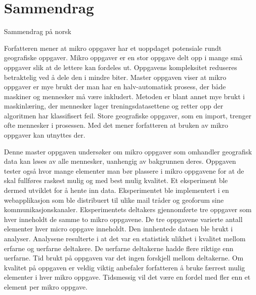 

\chapter*{Sammendrag}
%
	
	
Sammendrag på norsk

Forfatteren mener at mikro oppgaver har et uoppdaget potensiale rundt geografiske oppgaver. Mikro oppgaver er en stor oppgave delt opp i mange små oppgaver slik at de lettere kan fordeles ut. Oppgavens kompleksitet reduseres betraktelig ved å dele den i mindre biter. Master oppgaven viser at mikro oppgaver er mye brukt der man har en halv-automatisk prosess, der både maskiner og mennesker må være inkludert. Metoden er blant annet mye brukt i maskinlæring, der mennesker lager treningsdatasettene og retter opp der algoritmen har klassifisert feil. Store geografiske oppgaver, som en import, trenger ofte mennesker i prosessen. Med det mener forfatteren at bruken av mikro oppgaver kan utnyttes der. 

Denne master oppgaven undersøker om mikro oppgaver som omhandler geografisk data kan løses av alle mennesker, uanhengig av bakgrunnen deres. Oppgaven tester også hvor mange elementer man bør plassere i mikro oppgavene for at de skal fullføres raskest mulig og med best mulig kvalitet. Et eksperiment ble dermed utviklet for å hente inn data. Eksperimentet ble implementert i en webapplikasjon som ble distribuert til ulike mail tråder og geoforum sine kommunikasjonskanaler. Eksperimentets deltakers gjennomførte tre oppgaver som hver inneholdt de samme to mikro oppgavene. De tre oppgavene varierte antall elementer hver micro oppgave inneholdt. Den innhentede dataen ble brukt i analyser. Analysene resulterte i at det var en statistisk ulikhet i kvalitet mellom erfarne og uerfarne deltakere. De uerfarne deltakerne hadde flere riktige enn uerfarne. Tid brukt på oppgaven var det ingen forskjell mellom deltakerne. Om kvalitet på oppgaven er veldig viktig anbefaler forfatteren å bruke færrest mulig elementer i hver mikro oppgave. Tidsmessig vil det være en fordel med fler enn et element per mikro oppgave. 
